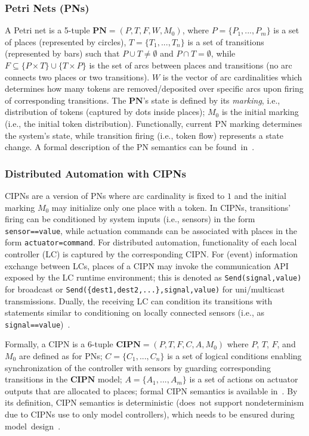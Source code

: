 \subsubsection*{Petri Nets (PNs)}
A Petri net is a 5-tuple $\mathbf{PN}=(P,T,F,W,M_0)$, where $P=\{P_1,...,P_m\}$ is a set of places (represented by circles), $T=\{T_1,...,T_n\}$ is a set of transitions (represented by bars) such that $P\cup T \neq \emptyset$ and $P\cap T = \emptyset$, while $F\subseteq\{P \times T\}\cup \{T\times P\}$ is the set of arcs between places and transitions (no arc connects two places or two transitions). $W$ is the vector of arc cardinalities which determines how many tokens are removed/deposited over specific arcs upon firing of corresponding transitions. The $\mathbf{PN}$'s state  is defined by its \emph{marking}, i.e., distribution of tokens (captured by dots inside places); $M_0$ is the initial marking (i.e., the initial token distribution). Functionally, current PN marking determines the system's state, while transition firing (i.e., token flow) represents a state change. A formal description of the PN semantics can be found~in~\cite{Murata1989541}.

\subsubsection*{Distributed Automation with CIPNs}
CIPNs are a version of PNs where arc cardinality is fixed to $1$ and the initial marking $M_0$ may initialize only one place with a token. In CIPNs, transitions' firing can be conditioned by system inputs (i.e., sensors) in the form \verb!sensor==value!, while actuation commands can be associated with places in the form \verb!actuator=command!. For distributed automation, functionality of each local controller (LC) is captured by the corresponding CIPN.
For (event) information exchange between LCs, places of a CIPN may invoke the communication API exposed by the LC runtime environment; %
this is denoted as \verb!Send(signal,value)! for broadcast or \verb!Send({dest1,dest2,...},signal,value)! for uni/multicast transmissions. Dually, the receiving LC can condition its transitions with statements similar to conditioning on locally connected sensors (i.e., as \verb!signal==value!)~\cite{jakovljevic_tcst19}.

Formally, a CIPN is a 6-tuple $\mathbf{CIPN}=(P,T,F,C, A, M_0)$ where $P$, $T$, $F$, and $M_0$ are defined as for PNs; $C=\{C_1,...,C_n\}$ is a set of logical conditions %
enabling synchronization of the controller with sensors by guarding corresponding transitions in the $\mathbf{CIPN}$ model; %
$A=\{A_1,...,A_m\}$ is a set of actions %
on actuator outputs that are allocated to places; formal CIPN semantics is available in~\cite{David20101}. By its definition, CIPN semantics is deterministic (does~not support nondeterminism due to CIPNs use to only model controllers), which needs to be ensured during model~design~\cite{david1994petri}. %

